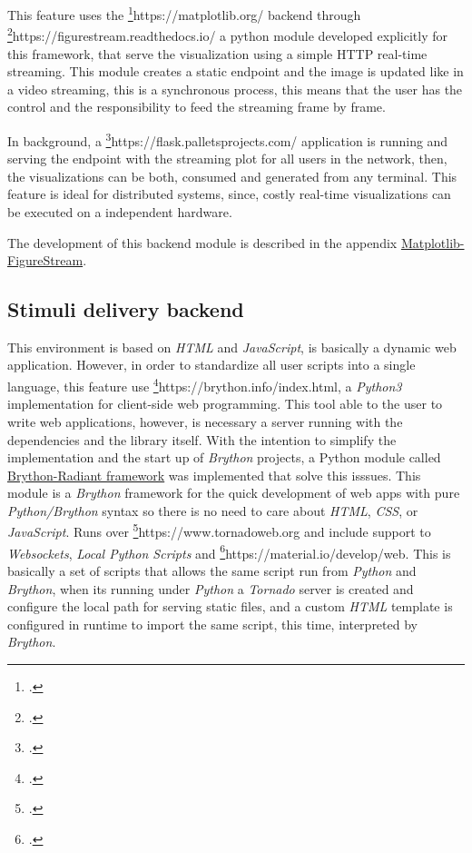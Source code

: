 This feature uses the \footcite{Matplotlib}{https://matplotlib.org/} backend through \footcite{FigureStream}{https://figurestream.readthedocs.io/}  a python module developed explicitly for this framework, that serve the visualization using a simple HTTP real-time streaming. This module creates a static endpoint and the image is updated like in a video streaming, this is a synchronous process, this means that the user has the control and the responsibility to feed the streaming frame by frame.

In background, a \footcite{Flask}{https://flask.palletsprojects.com/} application is running and serving the endpoint with the streaming plot for all users in the network, then, the visualizations can be both, consumed and generated from any terminal. This feature is ideal for distributed systems, since, costly real-time visualizations can be executed on a independent hardware.

The development of this backend module is described in the appendix \hyperref[appendix:matplotlib-figurestream]{Matplotlib-FigureStream}.




\subsection{Stimuli delivery backend}\label{ch4:stimuli_delivery_backend}

This environment is based on \textit{HTML} and \textit{JavaScript}, is basically a dynamic web application. However, in order to standardize all user scripts into a single language, this feature use \footcite{Brython}{https://brython.info/index.html}, a \textit{Python3} implementation for client-side web programming. This tool able to the user to write web applications, however, is necessary a server running with the dependencies and the library itself. With the intention to simplify the implementation and the start up of \textit{Brython} projects, a Python module called \hyperref[appendix:brython-radiant]{Brython-Radiant framework} was implemented that solve this isssues. This module is a \textit{Brython} framework for the quick development of web apps with pure \textit{Python/Brython} syntax so there is no need to care about \textit{HTML}, \textit{CSS}, or \textit{JavaScript}. Runs over \footcite{Tornado}{https://www.tornadoweb.org} and include support to \textit{Websockets}, \textit{Local Python Scripts} and \footcite{Material Design Components}{https://material.io/develop/web}. This is basically a set of scripts that allows the same script run from \textit{Python} and \textit{Brython}, when its running under \textit{Python} a \textit{Tornado} server is created and configure the local path for serving static files, and a custom \textit{HTML} template is configured in runtime to import the same script, this time, interpreted by \textit{Brython}.

